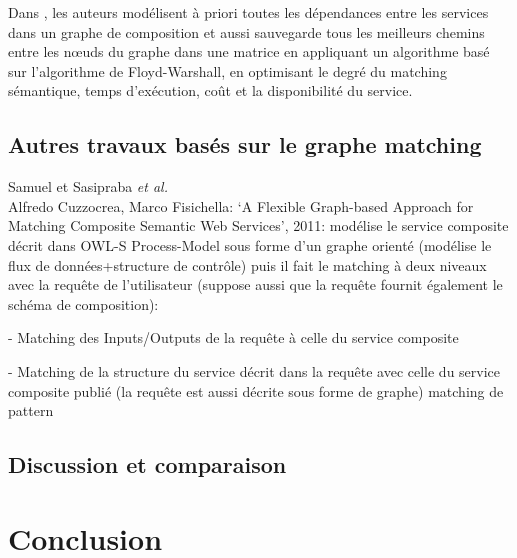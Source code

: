   \begin{text}
    Dans \cite{elmaghraoui2011graph}, les auteurs modélisent à priori
    toutes les dépendances entre les services dans un graphe de
    composition et aussi sauvegarde tous les meilleurs chemins entre
    les nœuds du graphe dans une matrice en appliquant un algorithme
    basé sur l'algorithme de Floyd-Warshall, en optimisant le degré du
    matching sémantique, temps d'exécution, coût et la disponibilité
    du service.
  \end{text}

  \subsection{Autres travaux basés sur le graphe matching}
  \label{sec:autres-travaux}
  \begin{text}
  Samuel et Sasipraba \textit{et al.} \cite{samuel2011approach}\\

  Alfredo Cuzzocrea, Marco Fisichella: ‘A Flexible Graph-based
  Approach for Matching Composite Semantic Web Services’, 2011:
  modélise le service composite décrit dans OWL-S Process-Model sous
  forme d’un graphe orienté (modélise le flux de données+structure de
  contrôle) puis il fait le matching à deux niveaux avec la requête de
  l’utilisateur (suppose aussi que la requête fournit également le
  schéma de composition):

  - Matching des Inputs/Outputs de la requête à celle du service
  composite

  - Matching de la structure du service décrit dans la requête avec
  celle du service composite publié (la requête est aussi décrite sous
  forme de graphe) matching de pattern
  \end{text}

  \newpage
  \subsection{Discussion et comparaison}
  \label{sec:discussion-comparaison}
  

  \newpage

\section*{Conclusion}
\label{sec:conclusion}
 


